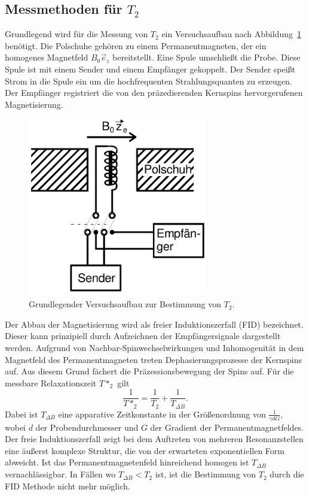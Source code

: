 \subsection{Messmethoden für $T_2$}

Grundlegend wird für die Messung von $T_2$ ein Versuchsaufbau nach
Abbildung~\ref{fig:aufbau} benötigt. Die Polschuhe gehören zu einem
Permanentmagneten, der ein homogenes Magnetfeld $B_0\vec{e}_z$
bereitstellt. Eine Spule umschließt die Probe.
Diese Spule ist mit einem Sender und einem Empfänger gekoppelt.
Der Sender speißt Strom in die Spule ein um die
hochfrequenten Strahlungsquanten zu erzeugen.
Der Empfänger registriert die von den präzedierenden Kernspins
hervorgerufenen Magnetisierung.
\begin{figure}
  \centering
  \includegraphics[width = 0.7\textwidth]{Pics/aufbau.pdf}
  \caption{Grundlegender Versuchsaufbau zur Bestimmung von $T_2$\cite{anleitung}.}
  \label{fig:aufbau}
\end{figure}
Der Abbau der Magnetisierung wird als freier Induktionszerfall (FID)
bezeichnet. Dieser kann prinzipiell durch Aufzeichnen der
Empfängersignale dargestellt werden.
Aufgrund von Nachbar-Spinwechselwirkungen und Inhomogenität in dem Magnetfeld des
Permanentmagneten treten Dephasierungsprozesse der Kernspins auf.
Aus diesem Grund fächert die Präzessionsbewegung der Spins
auf. Für die messbare Relaxationszeit $T*_2$ gilt
\begin{equation}
  \label{eqn:T*}
  \frac{1}{T*_2} = \frac{1}{T_2} + \frac{1}{T_{\Delta B}}.
\end{equation}
Dabei ist $T_{\Delta B}$ eine apparative Zeitkonstante in der
Größenordnung von $\frac{1}{\gamma d G}$, wobei $d$ der Probendurchmesser
und $G$ der Gradient der Permanentmagnetfeldes.
Der freie Induktionszerfall zeigt bei dem Auftreten von mehreren
Resonanzstellen eine äußerst komplexe Struktur, die von der erwarteten
exponentiellen Form abweicht.
Ist das Permanentmagnetenfeld hinreichend homogen ist
$T_{\Delta B}$ vernachlässigbar. In Fällen wo $T_{\Delta B} < T_2$
ist, ist die Bestimmung von $T_2$ durch die FID Methode nicht mehr möglich.

